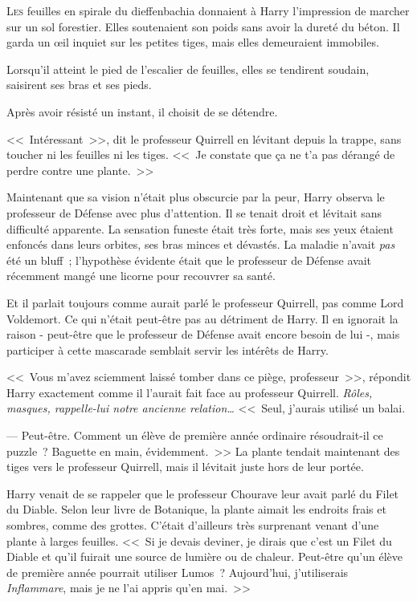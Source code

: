 
\lettrine{L}{es} feuilles en spirale du dieffenbachia donnaient à Harry l'impression de marcher sur un sol forestier. Elles soutenaient son poids sans avoir la dureté du béton. Il garda un œil inquiet sur les petites tiges, mais elles demeuraient immobiles.

Lorsqu'il atteint le pied de l'escalier de feuilles, elles se tendirent soudain, saisirent ses bras et ses pieds.

Après avoir résisté un instant, il choisit de se détendre.

<<~Intéressant~>>, dit le professeur Quirrell en lévitant depuis la trappe, sans toucher ni les feuilles ni les tiges. <<~Je constate que ça ne t'a pas dérangé de perdre contre une plante.~>>

Maintenant que sa vision n'était plus obscurcie par la peur, Harry observa le professeur de Défense avec plus d'attention. Il se tenait droit et lévitait sans difficulté apparente. La sensation funeste était très forte, mais ses yeux étaient enfoncés dans leurs orbites, ses bras minces et dévastés. La maladie n'avait \emph{pas} été un bluff~; l'hypothèse évidente était que le professeur de Défense avait récemment mangé une licorne pour recouvrer sa santé.

Et il parlait toujours comme aurait parlé le professeur Quirrell, pas comme Lord Voldemort. Ce qui n'était peut-être pas au détriment de Harry. Il en ignorait la raison - peut-être que le professeur de Défense avait encore besoin de lui -, mais participer à cette mascarade semblait servir les intérêts de Harry.

<<~Vous m'avez sciemment laissé tomber dans ce piège, professeur~>>, répondit Harry exactement comme il l'aurait fait face au professeur Quirrell. \emph{Rôles, masques, rappelle-lui notre ancienne relation…} <<~Seul, j'aurais utilisé un balai.

--- Peut-être. Comment un élève de première année ordinaire résoudrait-il ce puzzle~? Baguette en main, évidemment.~>> La plante tendait maintenant des tiges vers le professeur Quirrell, mais il lévitait juste hors de leur portée.

Harry venait de se rappeler que le professeur Chourave leur avait parlé du Filet du Diable. Selon leur livre de Botanique, la plante aimait les endroits frais et sombres, comme des grottes. C'était d'ailleurs très surprenant venant d'une plante à larges feuilles. <<~Si je devais deviner, je dirais que c'est un Filet du Diable et qu'il fuirait une source de lumière ou de chaleur. Peut-être qu'un élève de première année pourrait utiliser Lumos~? Aujourd'hui, j'utiliserais \emph{Inflammare}, mais je ne l'ai appris qu'en mai.~>>


